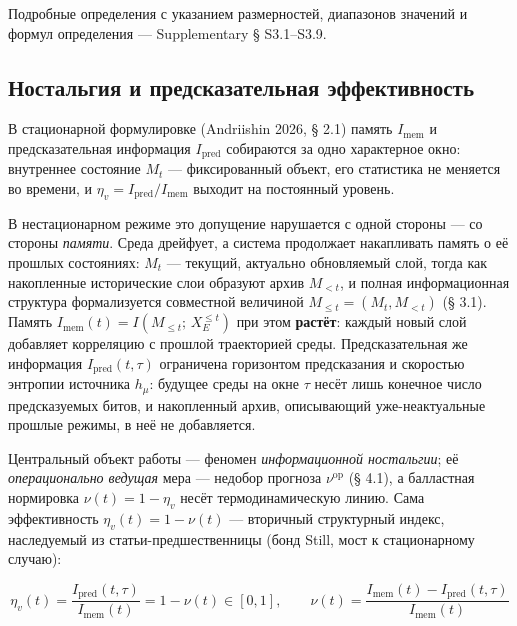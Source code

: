 \documentclass[pdflatex,sn-mathphys-ay]{sn-jnl}
\providecommand{\lt}{<}\providecommand{\gt}{>}
\begin{document}
Подробные определения с указанием размерностей, диапазонов значений и формул определения --- Supplementary § S3.1--S3.9.



\subsection{Ностальгия и предсказательная эффективность}\label{ux43dux43eux441ux442ux430ux43bux44cux433ux438ux44f-ux438-ux43fux440ux435ux434ux441ux43aux430ux437ux430ux442ux435ux43bux44cux43dux430ux44f-ux44dux444ux444ux435ux43aux442ux438ux432ux43dux43eux441ux442ux44c}



В стационарной формулировке (Andriishin 2026, § 2.1) память \(I_{\text{mem}}\) и предсказательная информация \(I_{\text{pred}}\) собираются за одно характерное окно: внутреннее состояние \(M_t\) --- фиксированный объект, его статистика не меняется во времени, и \(\eta_v = I_{\text{pred}}/I_{\text{mem}}\) выходит на постоянный уровень.



В нестационарном режиме это допущение нарушается с одной стороны --- со стороны \emph{памяти}. Среда дрейфует, а система продолжает накапливать память о её прошлых состояниях: \(M_t\) --- текущий, актуально обновляемый слой, тогда как накопленные исторические слои образуют архив \(M_{\lt t}\), и полная информационная структура формализуется совместной величиной \(M_{\le t} = (M_t, M_{\lt t})\) (§ 3.1). Память \(I_{\text{mem}}(t) = I(M_{\le t};\, X_E^{\le t})\) при этом \textbf{растёт}: каждый новый слой добавляет корреляцию с прошлой траекторией среды. Предсказательная же информация \(I_{\text{pred}}(t,\tau)\) ограничена горизонтом предсказания и скоростью энтропии источника \(h_\mu\): будущее среды на окне \(\tau\) несёт лишь конечное число предсказуемых битов, и накопленный архив, описывающий уже-неактуальные прошлые режимы, в неё не добавляется.



Центральный объект работы --- феномен \emph{информационной ностальгии}; её \emph{операционально ведущая} мера --- недобор прогноза \(\nu^{\text{op}}\) (§ 4.1), а балластная нормировка \(\nu(t) = 1 - \eta_v\) несёт термодинамическую линию. Сама эффективность \(\eta_v(t) = 1 - \nu(t)\) --- вторичный структурный индекс, наследуемый из статьи-предшественницы (бонд Still, мост к стационарному случаю):



\[\eta_v(t) = \frac{I_{\text{pred}}(t,\tau)}{I_{\text{mem}}(t)} = 1 - \nu(t) \in [0,1], \qquad \nu(t) = \frac{I_{\text{mem}}(t) - I_{\text{pred}}(t,\tau)}{I_{\text{mem}}(t)}\]
\end{document}
